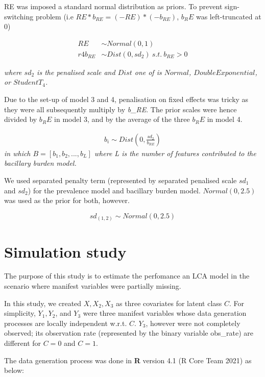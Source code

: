 \documentclass[
]{article}
\begin{document}
RE was imposed a standard normal distribution as priors. To prevent sign-switching problem (i.e \(RE*b_{RE} = (-RE)*(-b_{RE})\), \(b_RE\) was left-truncated at 0)

\[
\begin{aligned}
RE &\sim Normal(0,1)\\r4
b_{RE} &\sim Dist(0, sd_2)\  s.t.\ b_{RE} > 0
\end{aligned}
\]

\emph{where \(sd_2\) is the penalised scale and \(Dist\) one of is \(Normal\), \(DoubleExponential\), or \(StudentT_4\).}

Due to the set-up of model 3 and 4, penalisation on fixed effects was tricky as they were all subsequently multiply by \emph{b\_RE}. The prior scales were hence divided by \(b_RE\) in model 3, and by the average of the three \(b_RE\) in model 4.

\[
\begin{aligned}
b_i \sim Dist(0, \frac{sd_2}{b_{RE}})
\end{aligned}
\]
\emph{in which \(B=[b_1, b_2, ..., b_L]\) where L is the number of features contributed to the bacillary burden model.}

We used separated penalty term (represented by separated penalised scale \(sd_1\) and \(sd_2\)) for the prevalence model and bacillary burden model. \(Normal(0, 2.5)\) was used as the prior for both, however.

\[
sd_{(1,2)} \sim Normal(0, 2.5)
\]

\hypertarget{appendix-simulation-study}{%
\section{Simulation study}\label{appendix-simulation-study}}

The purpose of this study is to estimate the perfomance an LCA model in the scenario where manifest variables were partially missing.

In this study, we created \(X, X_2, X_3\) as three covariates for latent class \(C\). For simplicity, \(Y_1, Y_2\), and \(Y_3\) were three manifest variables whose data generation processes are locally independent w.r.t. \(C\). \(Y_3\), however were not completely observed; its observation rate (represented by the binary variable obs\_rate) are different for \(C=0\) and \(C=1\).

The data generation process was done in \textbf{R} version 4.1 (R Core Team 2021) as below:
\end{document}
